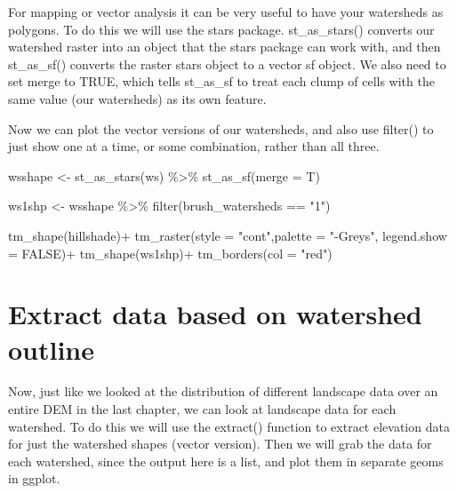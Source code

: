 \documentclass[
]{book}
\newenvironment{Shaded}{\begin{snugshade}}{\end{snugshade}}
\newcommand{\AttributeTok}[1]{\textcolor[rgb]{0.77,0.63,0.00}{#1}}
\newcommand{\ConstantTok}[1]{\textcolor[rgb]{0.00,0.00,0.00}{#1}}
\newcommand{\FunctionTok}[1]{\textcolor[rgb]{0.00,0.00,0.00}{#1}}
\newcommand{\NormalTok}[1]{#1}
\newcommand{\OtherTok}[1]{\textcolor[rgb]{0.56,0.35,0.01}{#1}}
\newcommand{\SpecialCharTok}[1]{\textcolor[rgb]{0.00,0.00,0.00}{#1}}
\newcommand{\StringTok}[1]{\textcolor[rgb]{0.31,0.60,0.02}{#1}}
\begin{document}
For mapping or vector analysis it can be very useful to have your watersheds as polygons. To do this we will use the stars package. st\_as\_stars() converts our watershed raster into an object that the stars package can work with, and then st\_as\_sf() converts the raster stars object to a vector sf object. We also need to set merge to TRUE, which tells st\_as\_sf to treat each clump of cells with the same value (our watersheds) as its own feature.

Now we can plot the vector versions of our watersheds, and also use filter() to just show one at a time, or some combination, rather than all three.

\begin{Shaded}
\begin{Highlighting}[]
\NormalTok{wsshape }\OtherTok{\textless{}{-}} \FunctionTok{st\_as\_stars}\NormalTok{(ws) }\SpecialCharTok{\%\textgreater{}\%} \FunctionTok{st\_as\_sf}\NormalTok{(}\AttributeTok{merge =}\NormalTok{ T)}

\NormalTok{ws1shp }\OtherTok{\textless{}{-}}\NormalTok{ wsshape }\SpecialCharTok{\%\textgreater{}\%} \FunctionTok{filter}\NormalTok{(brush\_watersheds }\SpecialCharTok{==} \StringTok{"1"}\NormalTok{)}

\FunctionTok{tm\_shape}\NormalTok{(hillshade)}\SpecialCharTok{+}
  \FunctionTok{tm\_raster}\NormalTok{(}\AttributeTok{style =} \StringTok{"cont"}\NormalTok{,}\AttributeTok{palette =} \StringTok{"{-}Greys"}\NormalTok{, }\AttributeTok{legend.show =} \ConstantTok{FALSE}\NormalTok{)}\SpecialCharTok{+}
\FunctionTok{tm\_shape}\NormalTok{(ws1shp)}\SpecialCharTok{+}
  \FunctionTok{tm\_borders}\NormalTok{(}\AttributeTok{col =} \StringTok{"red"}\NormalTok{)}
\end{Highlighting}
\end{Shaded}

\hypertarget{extract-data-based-on-watershed-outline}{%
\section{Extract data based on watershed outline}\label{extract-data-based-on-watershed-outline}}

Now, just like we looked at the distribution of different landscape data over an entire DEM in the last chapter, we can look at landscape data for each watershed. To do this we will use the extract() function to extract elevation data for just the watershed shapes (vector version). Then we will grab the data for each watershed, since the output here is a list, and plot them in separate geoms in ggplot.
\end{document}
